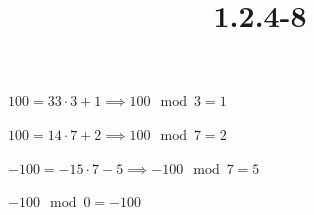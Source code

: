 \documentclass{article}
\title{1.2.4-8}
\begin{document}
\maketitle

\( 100 = 33 \cdot 3 + 1 \implies 100 \mod 3 = 1 \)

\( 100 = 14 \cdot 7 + 2 \implies 100 \mod 7 =  2 \)

\( -100 = -15 \cdot 7 - 5 \implies -100 \mod 7 = 5 \)

\( -100 \mod 0 = -100 \)
\end{document}
